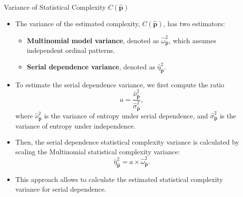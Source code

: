 \documentclass{beamer}
\begin{document}
	
	
	
	

\begin{frame}{Variance of Statistical Complexity $C(\widehat{\mathbf{p}})$}
	\begin{itemize}
		\item The variance of the estimated complexity, $C(\widehat{\mathbf{p}})$, has two estimators:
		\begin{itemize}
			\item \textbf{Multinomial model variance}, denoted as $\widehat{\omega}^2_{\widehat{\mathbf{p}}}$, which assumes independent ordinal patterns.
			\item \textbf{Serial dependence variance}, denoted as $\widehat{\eta}^2_{\widehat{\mathbf{p}}}$.
		\end{itemize}
	\end{itemize}
\end{frame}

\begin{frame}
		\begin{itemize}
		\item To estimate the serial dependence variance, we first compute the ratio
	$$
		a = \dfrac{\widehat{\nu}^2_{\widehat{\mathbf{p}}}}{\widehat{\sigma}^2_{\widehat{\mathbf{p}}}},
		$$
		where $\widehat{\nu}^2_{\widehat{\mathbf{p}}}$ is the variance of entropy under serial dependence, and $\widehat{\sigma}^2_{\widehat{\mathbf{p}}}$ is the variance of entropy under independence.
		\item Then, the serial dependence statistical complexity variance is calculated by scaling the Multinomial statistical complexity variance:
		\[
		\widehat{\eta}^2_{\widehat{\mathbf{p}}} = a \times \widehat{\omega}^2_{\widehat{\mathbf{p}}}.
		\]
		\item This approach allows to calculate the estimated statistical complexity variance for serial dependence. 
	\end{itemize}
\end{frame}
\end{document}
